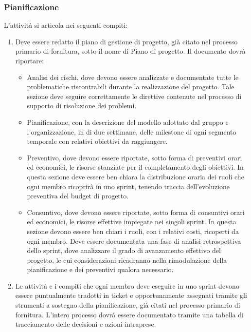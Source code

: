 \subsubsection{Pianificazione}
L'attività si articola nei seguenti compiti:
\begin{enumerate}
    \item Deve essere redatto il piano di gestione di progetto, già citato nel processo primario di fornitura, sotto il nome di Piano di progetto. Il documento dovrà riportare:
\begin{itemize}
    \item Analisi dei rischi, dove devono essere analizzate e documentate tutte le problematiche riscontrabili durante la realizzazione del progetto. Tale sezione deve seguire correttamente le direttive contenute nel processo di supporto di risoluzione dei problemi.
    \item Pianificazione, con la descrizione del modello adottato dal gruppo e l'organizzazione, in  di due settimane, delle milestone di ogni segmento temporale con relativi obiettivi da raggiungere.
    \item Preventivo, dove devono essere riportate, sotto forma di preventivi orari ed economici, le risorse stanziate per il completamento degli obiettivi. In questa sezione deve essere ben chiara la distribuzione oraria dei ruoli che ogni membro ricoprirà in uno sprint, tenendo traccia dell'evoluzione preventiva del budget di progetto.
    \item Consuntivo, dove devono essere riportate, sotto forma di consuntivi orari ed economici, le risorse effettive impiegate nei singoli sprint. In questa sezione devono essere ben chiari i ruoli, con i relativi costi, ricoperti da ogni membro. Deve essere documentata una fase di analisi retrospettiva dello sprint, dove analizzare il grado di avanzamento effettivo del progetto, le cui considerazioni ricadranno nella rimodulazione della pianificazione e dei preventivi qualora necessario.
\end{itemize}
    \item Le attività e i compiti che ogni membro deve eseguire in uno sprint devono essere puntualmente tradotti in ticket e opportunamente assegnati tramite gli strumenti a sostegno della pianificazione, già citati nel processo primario di fornitura. L'intero processo dovrà essere documentato tramite una tabella di tracciamento delle decisioni e azioni intraprese.
\end{enumerate}


